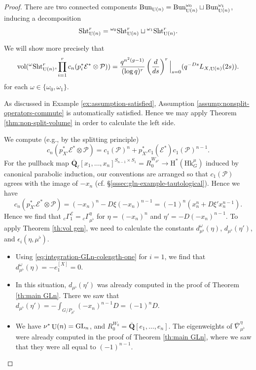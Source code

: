 \documentclass[reqno]{amsart}
\numberwithin{equation}{subsection}
\theoremstyle{definition}
\newcommand\cE{\mathcal{E}}
\newcommand\cP{\mathcal{P}}
\newcommand{\Bun}{\textup{Bun}}
\newcommand\Hk{\mathrm{Hk}}
\newcommand\Sht{\textup{Sht}}
\newcommand{\vol}{\textup{vol}}
\newcommand\GL{\textup{GL}}
\DeclareMathOperator{\U}{U}
\newcommand\ot{\otimes}
\newcommand{\Q}{\mathbf{Q}}
\newcommand{\ol}[1]{\overline{#1}}
\newcommand{\rH}{\ensuremath{\mathrm{H}}\xspace}
\begin{document}
\begin{proof}
There are two connected components $\Bun_{\U(n)} = \Bun_{\U(n)}^{\omega_0} \sqcup \Bun_{\U(n)}^{\omega_1}$, inducing a decomposition
\[
\Sht_{\U(n)}^r = {}^{\omega_0} \Sht_{\U(n)}^r \sqcup {}^{\omega_1} \Sht_{\U(n)}^r.
\]

We will show more precisely that 
\[
\vol({}^{\omega} \Sht_{\U(n)}^r,  \prod_{i=1}^{r}c_{n}(p_{i}^{*}\cE^{*}\ot\cP))= \frac{q^{n^{2}(g-1)}}{(\log q)^{r}}\left(\frac{d}{ds}\right)^{r}\Big|_{s=0}(q^{-Ds}L_{X,\U(n)}(2s)).
\]
for each $\omega \in \{\omega_0, \omega_1\}$. 

As discussed in Example \ref{ex:assumption-satisfied}, Assumption \ref{assump:nonsplit-operators-commute} is automatically satisfied. Hence we may apply Theorem \ref{thm:non-split-volume} in order to calculate the left side. 

We compute (e.g., by the splitting principle) 
\begin{equation*}
c_n(p_{X'}^* \cE^{*} \otimes \cP) = c_1(\cP)^n  +  p_{X'}^*c_1(\cE^{*}) c_1(\cP)^{n-1}.
\end{equation*}
For the pullback map $\ol \Q_\ell[x_1, \ldots, x_n]^{S_{n-1} \times S_1} = R_0^{W_{\mu^\flat}} \rightarrow \rH^*(\Hk_G^\mu)$ induced by canonical parabolic induction, our conventions are arranged so that $c_1(\cP)$ agrees with the image of $-x_n$ (cf. \S \ref{sssec:gln-example-tautological}). Hence we have
\[
c_n(p_{X'}^* \cE^* \otimes \cP) = (-x_n)^n - D \xi  (-x_n)^{n-1} = (-1)^n(x_n^n + D \xi' x_n^{n-1} ) .
\]
Hence we find that ${}_c\Gamma^{\cE}_{1} = {}_c\Gamma^{\eta}_{\mu^\flat}$ for $\eta = (-x_n)^n$ and $\eta' = - D (-x_n)^{n-1}$. To apply Theorem \ref{th:vol gen}, we need to calculate the constants $d_{\mu^\flat}^\omega(\eta)$, $d_{\mu^\flat}(\eta')$, and $\epsilon_i(\eta, \mu^\flat)$. 
\begin{itemize}

\item Using \eqref{eq:integration-GLn-colength-one} for $i=1$, we find that $d_{\mu^\flat}^\omega (\eta) =- e_1^{[X]} = 0$.

\item In this situation, $d_{\mu^\flat}(\eta')$ was already computed in the proof of Theorem \ref{th:main GLn}. There we saw that $ d_{\mu^\flat}(\eta') = -  \int_{G/P_{\mu^\flat}} (-x_n)^{n-1} D = (-1)^n D$.

\item We have $\nu^* \U(n) = \GL_n$, and $R_0^{W_0} = \ol \Q[e_1, \ldots, e_n]$. The eigenweights of $\ol \nabla^\eta_{\mu^\flat}$ were already computed in the proof of Theorem \ref{th:main GLn}, where we saw that they were all equal to $(-1)^{n-1}$. 


\end{itemize}
\end{proof}
\end{document}

